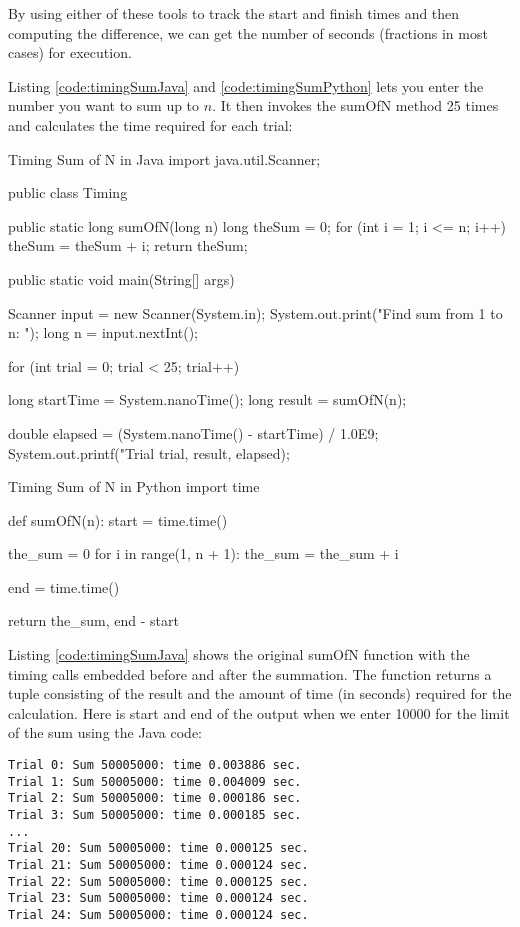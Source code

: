 By using either of these tools to track the start and finish times and then computing the difference, we can get the number of seconds (fractions in most cases) for execution.

Listing \ref{code:timingSumJava} and \ref{code:timingSumPython} lets you enter the number you want to sum up to $n$. It then invokes the sumOfN method 25 times and calculates the time required for each trial:

\begin{javacode}[label={code:timingSumJava}]{Timing Sum of N in Java}
import java.util.Scanner;

public class Timing {
	public static long sumOfN(long n) {
		long theSum = 0;
		for (int i = 1; i <= n; i++) {
			theSum = theSum + i;
		}
		return theSum;
	}
	
	public static void main(String[] args) {
		
		Scanner input = new Scanner(System.in);
		System.out.print("Find sum from 1 to n: ");
		long n = input.nextInt();
		
		for (int trial = 0; trial < 25; trial++) {
			long startTime = System.nanoTime();
			long result = sumOfN(n);
			
			double elapsed = (System.nanoTime() - startTime) / 1.0E9;
			System.out.printf("Trial %
			trial, result, elapsed);
		}
	}
}
\end{javacode}


\begin{pycode}[label={code:timingSumPython}]{Timing Sum of N in Python}
import time

def sumOfN(n):
	start = time.time()
	
	the_sum = 0
	for i in range(1, n + 1):
		the_sum = the_sum + i
		
	end = time.time()

return the_sum, end - start

\end{pycode}

Listing \ref{code:timingSumJava} shows the original sumOfN function with the timing calls embedded before and after the summation. The function returns a tuple consisting of the result and the amount of time (in seconds) required for the calculation. Here is start and end of the output when we enter 10000 for the limit of the sum using the Java code:

\begin{verbatim}
Trial 0: Sum 50005000: time 0.003886 sec.
Trial 1: Sum 50005000: time 0.004009 sec.
Trial 2: Sum 50005000: time 0.000186 sec.
Trial 3: Sum 50005000: time 0.000185 sec.
...
Trial 20: Sum 50005000: time 0.000125 sec.
Trial 21: Sum 50005000: time 0.000124 sec.
Trial 22: Sum 50005000: time 0.000125 sec.
Trial 23: Sum 50005000: time 0.000124 sec.
Trial 24: Sum 50005000: time 0.000124 sec.
\end{verbatim}


